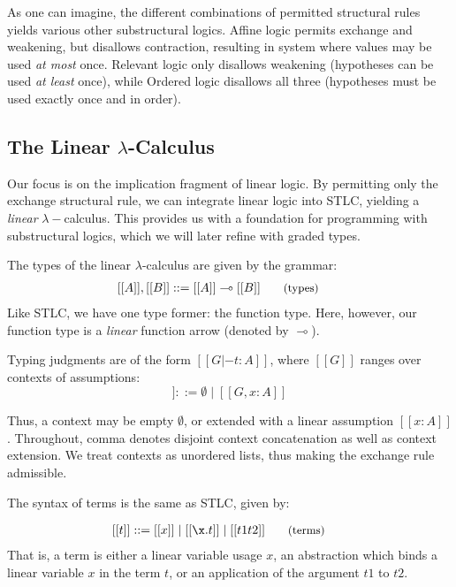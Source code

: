 As one can imagine, the different combinations of permitted structural rules
yields various other substructural logics. Affine logic permits
exchange and weakening, but disallows contraction, resulting in system where
values may be used \emph{at most}  once. Relevant logic only disallows
weakening (hypotheses can be used \emph{at least} once), while Ordered logic disallows all
three (hypotheses must be used exactly once and in order).

\subsection{The Linear $\lambda$-Calculus}
\label{sec:linear-lambda-calc}
Our focus is on the implication fragment of linear logic. By permitting only the
exchange structural rule, we can integrate linear logic into STLC, yielding a
\emph{linear} $\lambda-$calculus. This provides us with a foundation for
programming with substructural logics, which we will later refine with graded
types. 

The types of the linear $\lambda$-calculus are given by the grammar: 
\begin{align*}
  \hspace{-0.9em}[[ A ]] , [[ B ]] & ::=
         [[ A ]] \multimap [[ B ]]
  {\small{\tag{types}}}
\end{align*}
Like STLC, we have one type former: the function type. Here, however, our function type
is a \emph{linear} function arrow (denoted by $\multimap$).



Typing judgments are of the form $[[ G |- t : A ]]$, where $[[ G ]]$ ranges over
contexts of assumptions:
\begin{equation*}
  [[ G ]] ::= \emptyset
  \mid [[ G , x : A ]]
\tag{contexts}
\end{equation*}

Thus, a context may be empty $\emptyset$, or extended with a linear assumption $[[
x : A ]]$. Throughout, comma denotes disjoint context concatenation as well as 
context extension. We treat contexts as unordered lists, thus making the exchange 
rule admissible. 

The syntax of terms is the same as STLC, given by:

\begin{align*}
  \hspace{-0.8em} [[ t ]] ::= \;
         & [[ x ]]
    \mid [[ \x . t ]]
    \mid [[ t1 t2 ]]
  {\small{\tag{terms}}}
\end{align*}
That is, a term is either a linear variable usage $x$, an abstraction which binds a
linear variable $x$ in the term $t$, or an application of the argument $t1$ to $t2$. 

